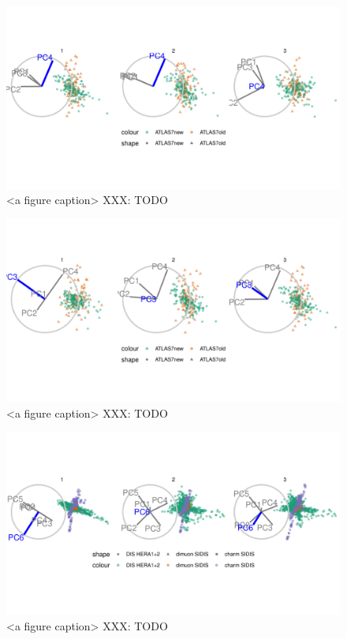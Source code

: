 \documentclass{monashthesis}
\begin{document}
\begin{figure}

{\centering \includegraphics[width=1\linewidth,]{./figures_from_script/ch3_fig4_jet_better_pc4} 

}

\caption{<a figure caption> XXX: TODO}\label{fig:ch3fig4}
\end{figure}

\begin{figure}

{\centering \includegraphics[width=1\linewidth,]{./figures_from_script/ch3_fig5_jet_worse_pc3} 

}

\caption{<a figure caption> XXX: TODO}\label{fig:ch3fig5}
\end{figure}

\begin{figure}

{\centering \includegraphics[width=1\linewidth,]{./figures_from_script/ch3_fig6_DIS_better_pc6} 

}

\caption{<a figure caption> XXX: TODO}\label{fig:ch3fig6}
\end{figure}
\end{document}
